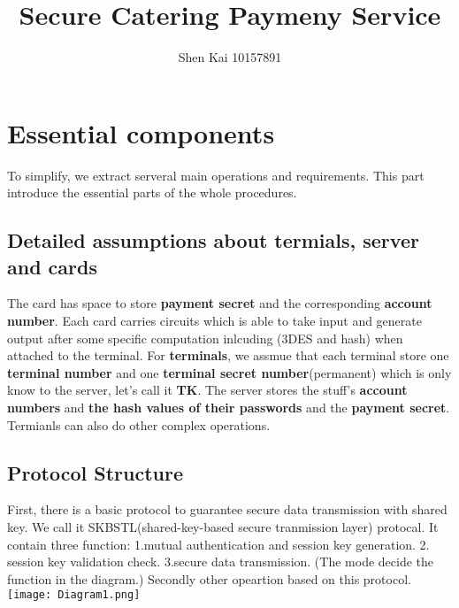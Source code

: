\documentclass{article}
\title{Secure Catering Paymeny Service}
\author{Shen Kai 10157891}
\begin{document}
    \maketitle
    \section{Essential components}
To simplify, we extract serveral main operations and requirements. 
This part introduce the essential parts of the whole procedures.
        \subsection*{Detailed assumptions about termials, server and cards}
The card has space to store \textbf{payment secret} and the corresponding \textbf{account number}. 
Each card carries  circuits which is able to take input and generate output after some specific computation inlcuding (3DES and hash) when attached to the terminal.
For \textbf{terminals}, we assmue that each terminal store one \textbf{terminal number} and one \textbf{terminal secret number}(permanent) which is only know to the server, let's call it \textbf{TK}. 
The server stores the stuff's \textbf{account numbers} and \textbf{the hash values of their passwords} and the \textbf{payment secret}.
Termianls can also do other complex operations.
        \newline
        \subsection*{Protocol Structure}
First, there is a basic protocol to guarantee secure data transmission with shared key. 
We call it SKBSTL(shared-key-based secure tranmission layer) protocal. 
It contain three function: 1.mutual authentication and session key generation. 2. session key validation check. 3.secure data transmission. (The mode decide the function in the diagram.)
Secondly other opeartion based on this protocol. 
        \newline
\texttt{[image: Diagram1.png]}
        \newline
\end{document}
